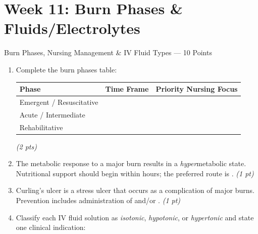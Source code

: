 \documentclass[11pt,letterpaper]{article}
\newcommand{\blank}[1][3cm]{\underline{\hspace{#1}}}
\begin{document}
\section{Week 11: Burn Phases \& Fluids/Electrolytes}

\begin{diagbox}{Burn Phases, Nursing Management \& IV Fluid Types --- 10 Points}

\begin{enumerate}[leftmargin=1.5em, label=\textbf{\arabic*.},start=121]

  \item Complete the burn phases table:

  \vspace{0.3cm}
  \begin{center}
  \renewcommand{\arraystretch}{1.7}
  \begin{tabular}{|p{2.8cm}|p{3cm}|p{5.5cm}|}
  \hline
  \textbf{Phase} & \textbf{Time Frame} & \textbf{Priority Nursing Focus} \\
  \hline
  Emergent / Resuscitative & \blank[2.5cm] & \blank[5cm] \\
  \hline
  Acute / Intermediate & \blank[2.5cm] & \blank[5cm] \\
  \hline
  Rehabilitative & \blank[2.5cm] & \blank[5cm] \\
  \hline
  \end{tabular}
  \end{center}
  \hfill\textit{(2 pts)}

  \item The metabolic response to a major burn results in a \emph{hyper}metabolic
        state.  Nutritional support should begin within \blank[2cm] hours;
        the preferred route is \blank[4cm].
        \hfill\textit{(1 pt)}

  \item Curling's ulcer is a stress ulcer that occurs as a complication of major
        burns.  Prevention includes administration of \blank[3cm]
        and/or \blank[3cm].
        \hfill\textit{(1 pt)}

  \item Classify each IV fluid solution as \emph{isotonic}, \emph{hypotonic}, or
        \emph{hypertonic} and state one clinical indication:


\end{enumerate}
\end{diagbox}
\end{document}
